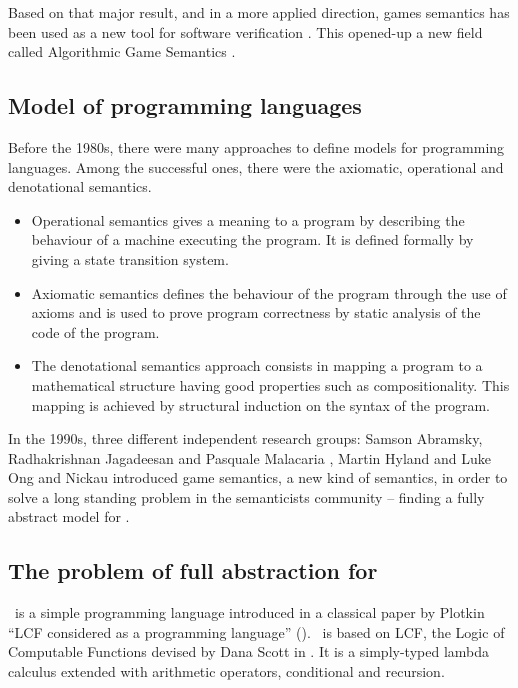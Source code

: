 Based on that major result, and in a more applied direction, games
semantics has been used as a new tool for software verification
\cite{ghicamccusker00}. This opened-up a new field called
Algorithmic Game Semantics \citep{Abr02}.




\subsection{Model of programming languages}

Before the 1980s, there were many approaches to define models for
programming languages. Among the successful ones, there were the
axiomatic, operational and denotational semantics.
\begin{itemize}
\item Operational semantics gives a meaning to a program by describing the
behaviour of a machine executing the program. It is defined formally
by giving a state transition system.
\item Axiomatic semantics defines the behaviour of the program
through the use of axioms and is used to prove program correctness
by static analysis of the code of the program.
\item The denotational semantics approach consists in mapping a program to a mathematical structure
having good properties such as compositionality. This mapping is
achieved by structural induction on the syntax of the program.
\end{itemize}

In the 1990s, three different independent research groups: Samson
Abramsky, Radhakrishnan Jagadeesan and Pasquale Malacaria
\citep{abramsky94full}, Martin Hyland and Luke Ong
\citep{hylandong_pcf} and Nickau \citep{Nickau:lfcs94} introduced
game semantics, a new kind of semantics, in order to solve a long
standing problem in the semanticists community -- finding a fully
abstract model for \pcf.

\subsection{The problem of full abstraction for \pcf}

\pcf\ is a simple programming language introduced in a classical
paper by Plotkin ``LCF considered as a programming language''
(\cite{DBLP:journals/tcs/Plotkin77}). \pcf\ is based on LCF, the
Logic of Computable Functions devised by Dana Scott in
\cite{scott_lcf}. It is a simply-typed lambda calculus extended with
arithmetic operators, conditional and recursion.

